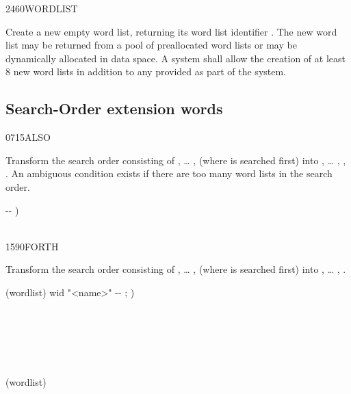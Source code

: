 \enlargethispage{2ex}
\begin{worddef}{2460}{WORDLIST}
\item {}

	Create a new empty word list, returning its word list identifier
	. The new word list may be returned from a pool of
	preallocated word lists or may be dynamically allocated in data
	space. A system shall allow the creation of at least 8 new word
	lists in addition to any provided as part of the system.
\end{worddef}


\subsection{Search-Order extension words} %
\extended

\begin{worddef}{0715}{ALSO}
\item \stack{}{}

	Transform the search order consisting of , {\ldots}
	,  (where  is searched
	first) into , {\ldots} , ,
	. An ambiguous condition exists if there are too
	many word lists in the search order.

	\begin{implement} %
		\word{:}   -{}- ) \\
		\tab {}     \\
		\word{;}
	\end{implement}

	\begin{testing} %
	\end{testing}
\end{worddef}

\pagebreak
\begin{worddef}{1590}{FORTH}
\item \stack{}{}

	Transform the search order consisting of , {\ldots}
	,  (where  is searched
	first) into , {\ldots} ,
	.

	\begin{implement} %
	\word{:} (wordlist)  wid "<name>" -{}- ; ) \\
	\tab {} \word{,} \\
	\tab {} \\
	\tab[2]    \\
	\tab[2]   \\
	\tab[2]    \\
	\word{;}

	 (wordlist) 
	\end{implement}
\end{worddef}


